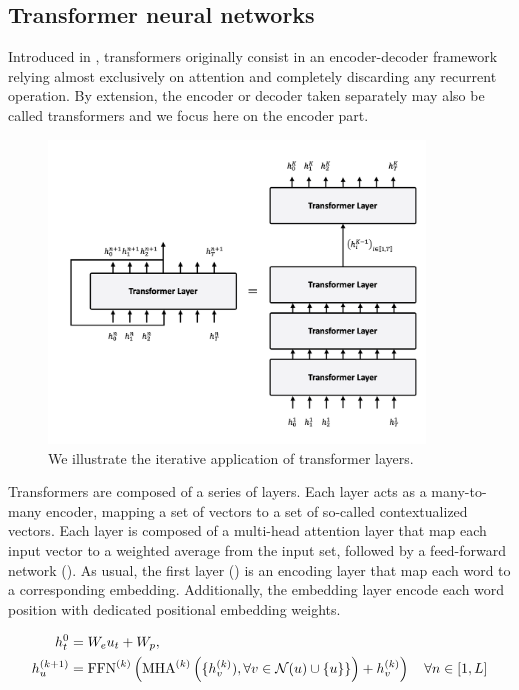 \subsection{Transformer neural networks}

Introduced in \textcite{vaswani_17}, transformers originally consist in an encoder-decoder framework relying almost exclusively on attention and completely discarding any recurrent operation. By extension, the encoder or decoder taken separately may also be called transformers and we focus here on the encoder part.

\begin{figure}[!ht]
	\includegraphics[width=10cm]{images/transformer_layer_unfold.png}
	\caption[RNN cell unfold]{We illustrate the iterative application of transformer layers.}
\end{figure}

Transformers are composed of a series of layers. Each layer acts as a many-to-many encoder, mapping a set of vectors to a set of so-called contextualized vectors. Each layer is composed of a multi-head attention layer that map each input vector to a weighted average from the input set, followed by a feed-forward network (). As usual, the first layer () is an encoding layer that map each word to a corresponding embedding. Additionally, the embedding layer encode each word position with dedicated positional embedding weights.


\begin{align}
    h^0_t &= W_eu_t + W_p, \labeq{transformers-emb}\\
    h^{(k+1)}_u &= \text{FFN}^{(k)}\left(\text{MHA}^{(k)}\left( \{h_v^{(k)}), \forall v \in \mathcal{N}(u) \cup \{u\}\}\right) + h_v^{(k)}\right) \quad \forall n \in [1, L] \labeq{transformers-layer}
\end{align}

